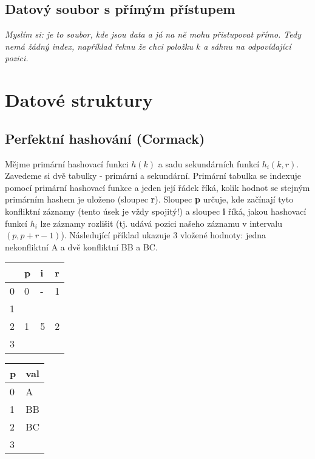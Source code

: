 \documentclass[a4paper,12pt]{article}
\begin{document}
\subsection{Datový soubor s přímým přístupem}
\setcounter{equation}{0}
\textit{Myslím si: je to soubor, kde jsou data a já na ně mohu přistupovat 
přímo. Tedy nemá žádný index, například řeknu že chci položku $k$ a sáhnu na 
odpovídající pozici.}


\section{Datové struktury}
\setcounter{equation}{0}
\subsection{Perfektní hashování (Cormack)}
\setcounter{equation}{0}
Mějme primární hashovací funkci $h(k)$ a sadu sekundárních funkcí $h_i(k,r)$.  
Zavedeme si dvě tabulky - primární a sekundární.  Primární tabulka se indexuje 
pomocí primární hashovací funkce a jeden její řádek říká, kolik hodnot se 
stejným primárním hashem je uloženo (sloupec \textbf{r}).  Sloupec \textbf{p} 
určuje, kde začínají tyto konfliktní záznamy (tento úsek je vždy spojitý!) a 
sloupec \textbf{i} říká, jakou hashovací funkcí $h_i$ lze záznamy rozlišit (tj.  
udává pozici našeho záznamu v intervalu $(p,p+r-1)$).  Následující příklad 
ukazuje 3 vložené hodnoty: jedna nekonfliktní A a dvě konfliktní BB a BC.

\begin{center}
\begin{tabular}{|l|l|l|l|}
\hline
	& \textbf{p} & \textbf{i} & \textbf{r} \\
\hline
0   & 0 & - & 1 \\
\hline
1   &   &   &   \\
\hline
2   & 1 & 5 & 2 \\
\hline
3   &   &   &   \\
\hline
\end{tabular}\hspace{3cm}
\begin{tabular}{|l|l|}
\hline
\textbf{p} & \textbf{val} \\
\hline
0 & A \\
\hline
1 & BB \\
\hline
2 & BC \\
\hline
3 &  \\
\hline
\end{tabular}
\end{center}
\end{document}
